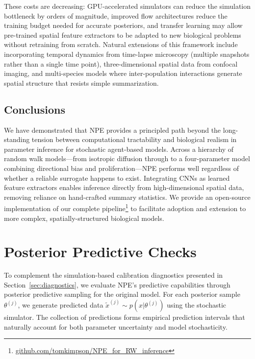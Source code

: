 \documentclass{article}
\begin{document}
These costs are decreasing: GPU-accelerated simulators can reduce the simulation bottleneck by orders of magnitude, improved flow architectures reduce the training budget needed for accurate posteriors, and transfer learning may allow pre-trained spatial feature extractors to be adapted to new biological problems without retraining from scratch. Natural extensions of this framework include incorporating temporal dynamics from time-lapse microscopy (multiple snapshots rather than a single time point), three-dimensional spatial data from confocal imaging, and multi-species models where inter-population interactions generate spatial structure that resists simple summarization.

\subsection{Conclusions}

We have demonstrated that NPE provides a principled path beyond the long-standing tension between computational tractability and biological realism in parameter inference for stochastic agent-based models. Across a hierarchy of random walk models---from isotropic diffusion through to a four-parameter model combining directional bias and proliferation---NPE performs well regardless of whether a reliable surrogate happens to exist. Integrating CNNs as learned feature extractors enables inference directly from high-dimensional spatial data, removing reliance on hand-crafted summary statistics. We provide an open-source implementation of our complete pipeline\footnote{\href{https://github.com/tomkimpson/NPE_for_RW_inference}{github.com/tomkimpson/NPE\_for\_RW\_inference}} to facilitate adoption and extension to more complex, spatially-structured biological models.

\newpage





\newpage
\appendix




\section{Posterior Predictive Checks}\label{sec:appendix_ppc}

To complement the simulation-based calibration diagnostics presented in Section~\ref{sec:diagnostics}, we evaluate NPE's predictive capabilities through posterior predictive sampling for the original model. For each posterior sample $\theta^{(j)}$, we generate predicted data $\tilde{x}^{(j)} \sim p(x|\theta^{(j)})$ using the stochastic simulator. The collection of predictions forms empirical prediction intervals that naturally account for both parameter uncertainty and model stochasticity.
\end{document}
